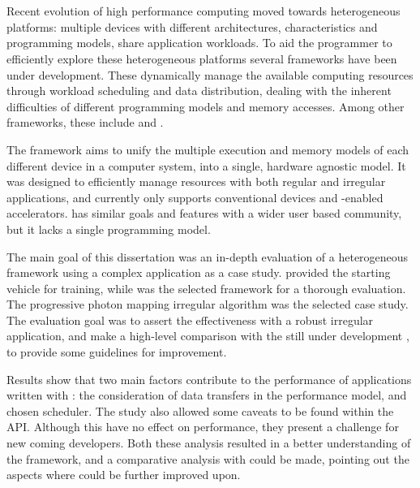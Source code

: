 \documentclass[main.tex]{subfiles}
\begin{document}
\cleardoublepage
{}
{}
\chapter*{\abstractname}

Recent evolution of high performance computing moved towards heterogeneous platforms: multiple devices with different architectures, characteristics and programming models, share application workloads. To aid the programmer to efficiently explore these heterogeneous platforms several frameworks have been under development. These dynamically manage the available computing resources through workload scheduling and data distribution, dealing with the inherent difficulties of different programming models and memory accesses. Among other frameworks, these include \gama and \starpu.

The \gama framework aims to unify the multiple execution and memory models of each different device in a computer system, into a single, hardware agnostic model. It was designed to efficiently manage resources with both regular and irregular applications, and currently only supports conventional \cpu devices and \cuda-enabled accelerators. \starpu has similar goals and features with a wider user based community, but it lacks a single programming model.

The main goal of this dissertation was an in-depth evaluation of a heterogeneous framework using a complex application as a case study. \gama provided the starting vehicle for training, while \starpu was the selected framework for a thorough evaluation. The progressive photon mapping irregular algorithm was the selected case study. The evaluation goal was to assert the \starpu effectiveness with a robust irregular application, and make a high-level comparison with the still under development \gama, to provide some guidelines for \gama improvement.

Results show that two main factors contribute to the performance of applications written with \starpu: the consideration of data transfers in the performance model, and chosen scheduler. The study also allowed some caveats to be found within the \starpu API. Although this have no effect on performance, they present a challenge for new coming developers. Both these analysis resulted in a better understanding of the framework, and a comparative analysis with \gama could be made, pointing out the aspects where \gama could be further improved upon.
\end{document}
